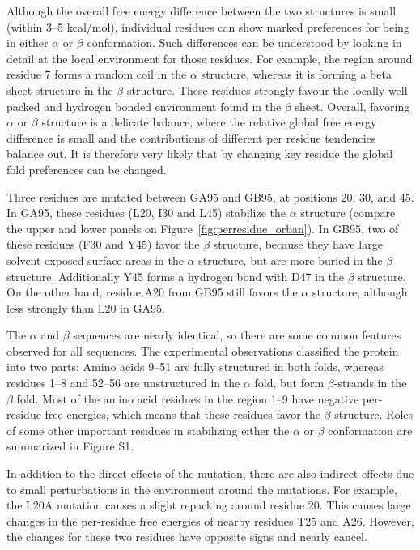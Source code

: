 \documentclass[12pt]{article}
\begin{document}
Although the overall free energy difference between the two structures is small (within 3--5 kcal/mol), individual
residues can show marked preferences for being in either $\alpha$ or $\beta$ conformation. Such differences can be
understood by looking in detail at the local environment for those residues. For example, the region around residue 7
forms a random coil in the $\alpha$ structure, whereas it is forming a beta sheet structure in the $\beta$ structure.
These residues strongly favour the locally well packed and hydrogen bonded environment found in the $\beta$ sheet.
Overall, favoring $\alpha$ or $\beta$ structure is a delicate balance, where the relative global free energy difference
is small and the contributions of different per residue tendencies balance out. It is therefore very likely that by
changing key residue the global fold preferences can be changed.

Three residues are mutated between GA95 and GB95, at positions 20, 30, and 45. In GA95, these residues (L20, I30 and
L45) stabilize the $\alpha$ structure (compare the upper and lower panels on Figure~\ref{fig:perresidue_orban}). In
GB95, two of these residues (F30 and Y45) favor the $\beta$ structure, because they have large solvent exposed surface
areas in the $\alpha$ structure, but are more buried in the $\beta$ structure. Additionally Y45 forms a hydrogen bond
with D47 in the $\beta$ structure. On the other hand, residue A20 from GB95 still favors the $\alpha$ structure,
although less strongly than L20 in GA95.

The $\alpha$ and $\beta$ sequences are nearly identical, so there are some common features observed for all sequences.
The experimental observations classified the protein into two parts: Amino acids 9--51 are fully structured in both
folds, whereas residues 1--8 and 52--56 are unstructured in the $\alpha$ fold, but form $\beta$-strands in the $\beta$
fold. Most of the amino acid residues in the region 1--9 have negative per-residue free energies, which means that these
residues favor the $\beta$ structure. Roles of some other important residues in stabilizing either the $\alpha$ or
$\beta$ conformation are summarized in Figure S1.

In addition to the direct effects of the mutation, there are also indirect effects due to small perturbations in the
environment around the mutations. For example, the L20A mutation causes a slight repacking around residue 20. This
causes large changes in the per-residue free energies of nearby residues T25 and A26. However, the changes for these two
residues have opposite signs and nearly cancel.
\end{document}
